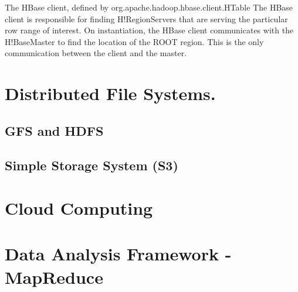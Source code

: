 \documentclass[a4paper]{article}
\begin{document}
The HBase client, defined by org.apache.hadoop.hbase.client.HTable 
The HBase client is responsible for finding H!RegionServers that are
serving the particular row range of interest. On instantiation, the
HBase client communicates with the H!BaseMaster to find the location
of the ROOT region. This is the only communication between the client
and the master. 

\section{Distributed File Systems.}

\subsection{GFS and HDFS} 

\subsection{Simple Storage System (S3)}


\section{Cloud Computing}

\section{Data Analysis Framework - MapReduce}



\end{document}
